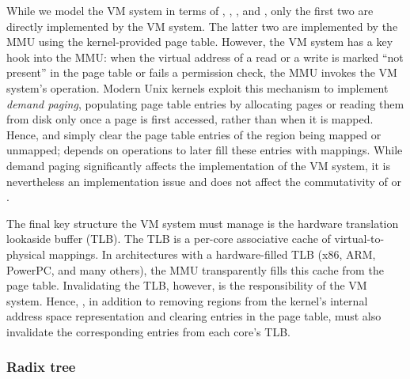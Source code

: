 While we model the VM system in terms of , ,
, and , only the first two are directly
implemented by the VM system.  The latter two are implemented by the
MMU using the kernel-provided page table.  However, the VM system has
a key hook into the MMU: when the virtual address of a read or a write
is marked ``not present'' in the page table or fails a permission
check, the MMU invokes the VM system's  operation.
Modern Unix kernels exploit this mechanism to implement \emph{demand
  paging}, populating page table entries by allocating pages or
reading them from disk only once a page is first accessed, rather than
when it is mapped.
%
Hence,  and  simply clear the page table
entries of the region being mapped or unmapped;  depends on
 operations to later fill these entries with mappings.
%
While demand paging significantly affects the implementation of the VM
system, it is nevertheless an implementation issue and does not affect
the commutativity of  or .

The final key structure the VM system must manage is the hardware
translation lookaside buffer (TLB).  The TLB is a per-core associative
cache of virtual-to-physical mappings.  In architectures with a
hardware-filled TLB (x86, ARM, PowerPC, and many others), the MMU
transparently fills this cache from the page table.  Invalidating the
TLB, however, is the responsibility of the VM system.  Hence,
, in addition to removing regions from the kernel's
internal address space representation and clearing entries in the page
table, must also invalidate the corresponding entries from each core's
TLB.


\subsubsection{Radix tree}
\label{sec:radixvm:tree}
\label{sec:topic:linux-coarse}


  

